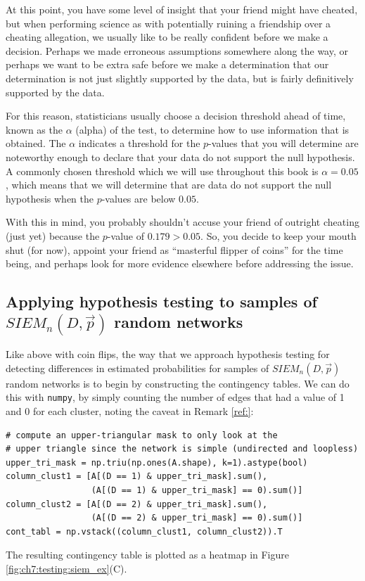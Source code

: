 At this point, you have some level of insight that your friend might have cheated, but when performing science as with potentially ruining a friendship over a cheating allegation, we usually like to be really confident before we make a decision. Perhaps we made erroneous assumptions somewhere along the way, or perhaps we want to be extra safe before we make a determination that our determination is not just slightly supported by the data, but is fairly definitively supported by the data. 

For this reason, statisticians usually choose a decision threshold ahead of time, known as the $\alpha$ (alpha) of the test, to determine how to use information that is obtained. The $\alpha$ indicates a threshold for the $p$-values that you will determine are noteworthy enough to declare that your data do not support the null hypothesis. A commonly chosen threshold which we will use throughout this book is $\alpha = 0.05$, which means that we will determine that are data do not support the null hypothesis when the $p$-values are below $0.05$. 

With this in mind, you probably shouldn't accuse your friend of outright cheating (just yet) because the $p$-value of $0.179 > 0.05$. So, you decide to keep your mouth shut (for now), appoint your friend as ``masterful flipper of coins'' for the time being, and perhaps look for more evidence elsewhere before addressing the issue. 

\subsection{Applying hypothesis testing to samples of $SIEM_n(D, \vec p)$ random networks}

Like above with coin flips, the way that we approach hypothesis testing for detecting differences in estimated probabilities for samples of $SIEM_n(D, \vec p)$ random networks is to begin by constructing the contingency tables. We can do this with \texttt{numpy}, by simply counting the number of edges that had a value of 1 and 0 for each cluster, noting the caveat in Remark \ref{ref:}:

\begin{lstlisting}[style=python]
# compute an upper-triangular mask to only look at the
# upper triangle since the network is simple (undirected and loopless)
upper_tri_mask = np.triu(np.ones(A.shape), k=1).astype(bool)
column_clust1 = [A[(D == 1) & upper_tri_mask].sum(), 
                 (A[(D == 1) & upper_tri_mask] == 0).sum()]
column_clust2 = [A[(D == 2) & upper_tri_mask].sum(), 
                 (A[(D == 2) & upper_tri_mask] == 0).sum()]
cont_tabl = np.vstack((column_clust1, column_clust2)).T
\end{lstlisting}
The resulting contingency table is plotted as a heatmap in Figure \ref{fig:ch7:testing:siem_ex}(C). 

